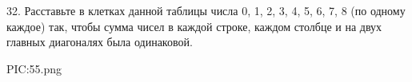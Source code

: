 32. Расставьте в клетках данной таблицы числа 0, 1, 2, 3, 4, 5, 6, 7, 8 (по одному каждое) так, чтобы сумма чисел в каждой строке, каждом столбце и на двух главных диагоналях была одинаковой.
\begin{center}
{{PIC:55.png}}
\end{center}
